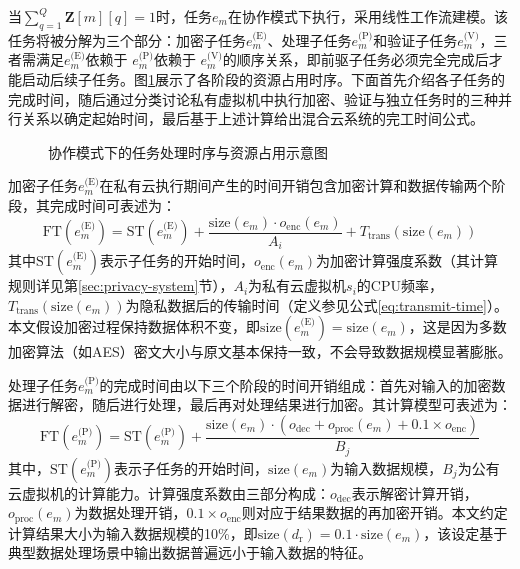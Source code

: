 当$\sum_{q = 1}^{Q} \mathbf{Z}[m][q] = 1$时，任务$e_m$在协作模式下执行，采用线性工作流建模。该任务将被分解为三个部分：加密子任务$e_m^\text{(E)}$、处理子任务$e_m^\text{(P)}$和验证子任务$e_m^\text{(V)}$，三者需满足$e_m^\text{(E)}$依赖于 $e_m^\text{(P)}$依赖于 $e_m^\text{(V)}$的顺序关系，即前驱子任务必须完全完成后才能启动后续子任务。图\ref{fig:coop-task}展示了各阶段的资源占用时序。下面首先介绍各子任务的完成时间，随后通过分类讨论私有虚拟机中执行加密、验证与独立任务时的三种并行关系以确定起始时间，最后基于上述计算给出混合云系统的完工时间公式。

\begin{figure}[htb]
    
    \caption{协作模式下的任务处理时序与资源占用示意图}\label{fig:coop-task}
\end{figure}

加密子任务$e_m^\text{(E)}$在私有云执行期间产生的时间开销包含加密计算和数据传输两个阶段，其完成时间可表述为：
\begin{equation}
    \text{FT}(e_m^\text{(E)}) = \text{ST}(e_m^\text{(E)}) + \frac{\text{size}(e_m)\cdot o_{\text{enc}}(e_m)}{A_i} + T_{\text{trans}}(\text{size}(e_m))
    \label{eq:enc-finish-time}
\end{equation}
其中$\text{ST}(e_m^\text{(E)})$表示子任务的开始时间，$o_{\text{enc}}(e_m)$为加密计算强度系数（其计算规则详见第\ref{sec:privacy-system}节），$A_i$为私有云虚拟机$s_i$的CPU频率，$T_{\text{trans}}(\text{size}(e_m))$为隐私数据后的传输时间（定义参见公式\eqref{eq:transmit-time}）。本文假设加密过程保持数据体积不变，即$\text{size}(e_m^{\text{(E)}}) = \text{size}(e_m)$，这是因为多数加密算法（如AES）密文大小与原文基本保持一致，不会导致数据规模显著膨胀。

处理子任务$e_m^\text{(P)}$的完成时间由以下三个阶段的时间开销组成：首先对输入的加密数据进行解密，随后进行处理，最后再对处理结果进行加密。其计算模型可表述为：
\begin{equation}
    \text{FT}(e_m^\text{(P)}) = \text{ST}(e_m^\text{(P)}) + \frac{\text{size}(e_m) \cdot \left(o_{\text{dec}} + o_{\text{proc}}(e_m) + 0.1\times o_{\text{enc}} \right)}{B_j}\label{eq:proc-finish-time}
\end{equation}
其中，$\text{ST}(e_m^\text{(P)})$表示子任务的开始时间，$\text{size}(e_m)$为输入数据规模，$B_j$为公有云虚拟机的计算能力。计算强度系数由三部分构成：$o_{\text{dec}}$表示解密计算开销，$o_{\text{proc}}(e_m)$为数据处理开销，$0.1\times o_{\text{enc}}$则对应于结果数据的再加密开销。本文约定计算结果大小为输入数据规模的10\%，即$\text{size}(d_\text{r}) = 0.1 \cdot \text{size}(e_m)$，该设定基于典型数据处理场景中输出数据普遍远小于输入数据的特征。

